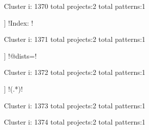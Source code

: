 Cluster i: 1370
total projects:2
total patterns:1
\begin{multicols}{1}
\begin{description}[noitemsep,topsep=0pt]
\item [[2] ] \cverb!Index: !
\end{description}
\end{multicols}







Cluster i: 1371
total projects:2
total patterns:1
\begin{multicols}{1}
\begin{description}[noitemsep,topsep=0pt]
\item [[2] ] \cverb!@dists=!
\end{description}
\end{multicols}







Cluster i: 1372
total projects:2
total patterns:1
\begin{multicols}{1}
\begin{description}[noitemsep,topsep=0pt]
\item [[2] ] \cverb!\?(.*)!
\end{description}
\end{multicols}







Cluster i: 1373
total projects:2
total patterns:1
\begin{multicols}{1}
\end{multicols}







Cluster i: 1374
total projects:2
total patterns:1
\begin{multicols}{1}
\begin{description}[noitemsep,topsep=0pt]
\item [[2] ] \cverb!\W_\(!
\end{description}
\end{multicols}







